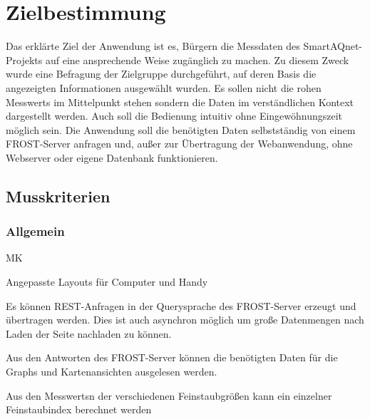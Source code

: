 \section{Zielbestimmung}
Das erklärte Ziel der Anwendung ist es, Bürgern die Messdaten des \gls{SmartAQnet}-Projekts auf eine ansprechende Weise zugänglich zu machen.
Zu diesem Zweck wurde eine Befragung der Zielgruppe durchgeführt, auf deren Basis die angezeigten Informationen ausgewählt wurden.
Es sollen nicht die rohen \glspl{Messwert} im Mittelpunkt stehen sondern die Daten im verständlichen Kontext dargestellt werden.
Auch soll die Bedienung intuitiv ohne Eingewöhnungszeit möglich sein.
Die Anwendung soll die benötigten Daten selbstständig von einem \gls{FROST-Server} anfragen und, außer zur Übertragung der \gls{Webanwendung}, ohne \gls{Webserver} oder eigene Datenbank funktionieren.

\subsection{Musskriterien}
\setcounter{counter}{10}

\subsubsection*{Allgemein}
\begin{Kriterien}{MK}

	\item Angepasste Layouts für Computer und \gls{Handy}
	
	\item Es können REST-Anfragen in der \gls{Querysprache} des \gls{FROST-Server} erzeugt und übertragen werden.
		Dies ist auch asynchron möglich um große Datenmengen nach Laden der Seite nachladen zu können.
	
	\item Aus den Antworten des \gls{FROST-Server} können die benötigten Daten für die \glspl{Graph} und Kartenansichten ausgelesen werden.
	
	\item Aus den \glspl{Messwert}n der verschiedenen Feinstaubgrößen kann ein einzelner \gls{Feinstaubindex} berechnet werden
\end{Kriterien}

